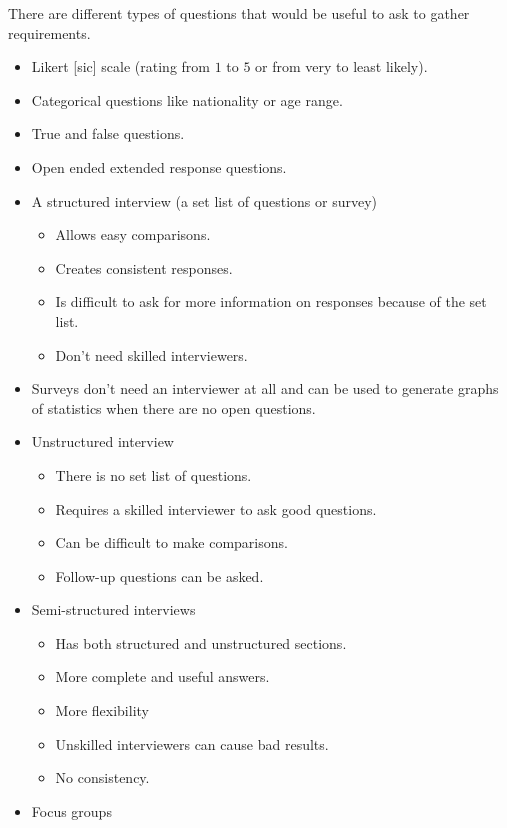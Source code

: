 \noindent
There are different types of questions that would be useful to ask to gather requirements.

\begin{itemize}
	\item Likert [sic] scale (rating from \(1\) to \(5\) or from very to least likely).
	\item Categorical questions like nationality or age range.
	\item True and false questions.
	\item Open ended extended response questions.
	\item A structured interview (a set list of questions or survey)

	      \begin{itemize}
		      \item Allows easy comparisons.
		      \item Creates consistent responses.
		      \item Is difficult to ask for more information on responses because of the set list.
		      \item Don't need skilled interviewers.
	      \end{itemize}
	\item Surveys don't need an interviewer at all and can be used to generate graphs of statistics when there are no open questions.
	\item Unstructured interview

	      \begin{itemize}
		      \item There is no set list of questions.
		      \item Requires a skilled interviewer to ask good questions.
		      \item Can be difficult to make comparisons.
		      \item Follow-up questions can be asked.
	      \end{itemize}
	\item Semi-structured interviews

	      \begin{itemize}
		      \item Has both structured and unstructured sections.
		      \item More complete and useful answers.
		      \item More flexibility
		      \item Unskilled interviewers can cause bad results.
		      \item No consistency.
	      \end{itemize}
	\item Focus groups


\end{itemize}

